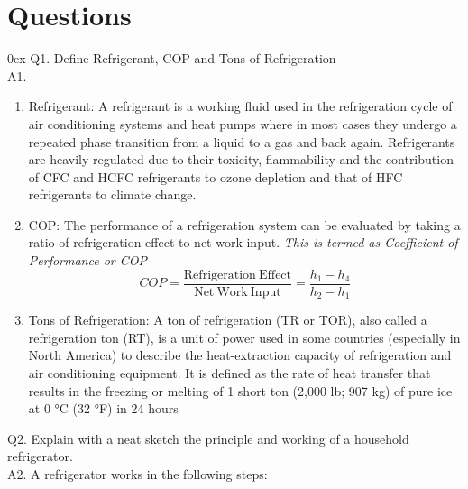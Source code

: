 \documentclass[11pt]{article}
\begin{document}
\section{Questions}
\parindent 0ex
Q1. Define Refrigerant, COP and Tons of Refrigeration \\
A1. 
\begin{enumerate}
	\item Refrigerant: A refrigerant is a working fluid used in the refrigeration cycle of air conditioning systems and heat pumps where in most cases they undergo a repeated phase transition from a liquid to a gas and back again. Refrigerants are heavily regulated due to their toxicity, flammability and the contribution of CFC and HCFC refrigerants to ozone depletion and that of HFC refrigerants to climate change.
	
	\item COP: The performance of a refrigeration system can be evaluated by taking a
	ratio of refrigeration effect to net work input. \textit{This is termed as Coefficient of Performance or COP}
	$$COP = \frac{\mathrm{Refrigeration\ Effect}}{\mathrm{Net\ Work\ Input}} = \frac{h_1-h_4}{h_2-h_1}$$
	
	
	
	\item Tons of Refrigeration: A ton of refrigeration (TR or TOR), also called a refrigeration ton (RT), is a unit of power used in some countries (especially in North America) to describe the heat-extraction capacity of refrigeration and air conditioning equipment. It is defined as the rate of heat transfer that results in the freezing or melting of 1 short ton (2,000 lb; 907 kg) of pure ice at 0 °C (32 °F) in 24 hours\\
\end{enumerate}



Q2. Explain with a neat sketch the principle and working of a household refrigerator.\\
A2. A refrigerator works in the following steps:
\end{document}
